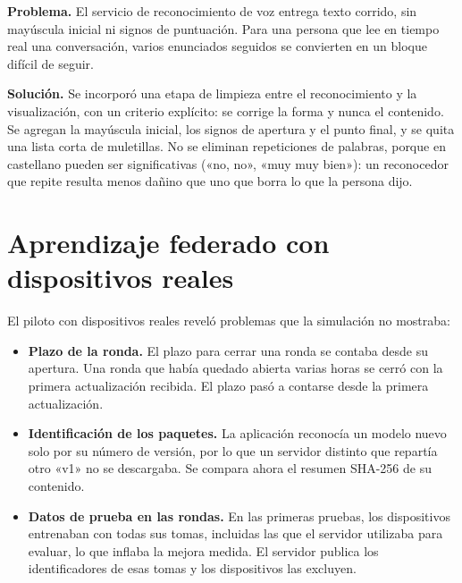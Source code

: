 \textbf{Problema.} El servicio de reconocimiento de voz entrega texto corrido, sin mayúscula inicial ni signos de puntuación. Para una persona que lee en tiempo real una conversación, varios enunciados seguidos se convierten en un bloque difícil de seguir.

\textbf{Solución.} Se incorporó una etapa de limpieza entre el reconocimiento y la visualización, con un criterio explícito: se corrige la forma y nunca el contenido. Se agregan la mayúscula inicial, los signos de apertura y el punto final, y se quita una lista corta de muletillas. No se eliminan repeticiones de palabras, porque en castellano pueden ser significativas («no, no», «muy muy bien»): un reconocedor que repite resulta menos dañino que uno que borra lo que la persona dijo.

\section{Aprendizaje federado con dispositivos reales}

El piloto con dispositivos reales reveló problemas que la simulación no mostraba:

\begin{itemize}
    \item \textbf{Plazo de la ronda.} El plazo para cerrar una ronda se contaba desde su apertura. Una ronda que había quedado abierta varias horas se cerró con la primera actualización recibida. El plazo pasó a contarse desde la primera actualización.
    \item \textbf{Identificación de los paquetes.} La aplicación reconocía un modelo nuevo solo por su número de versión, por lo que un servidor distinto que repartía otro «v1» no se descargaba. Se compara ahora el resumen SHA-256 de su contenido.
    \item \textbf{Datos de prueba en las rondas.} En las primeras pruebas, los dispositivos entrenaban con todas sus tomas, incluidas las que el servidor utilizaba para evaluar, lo que inflaba la mejora medida. El servidor publica los identificadores de esas tomas y los dispositivos las excluyen.
\end{itemize}

